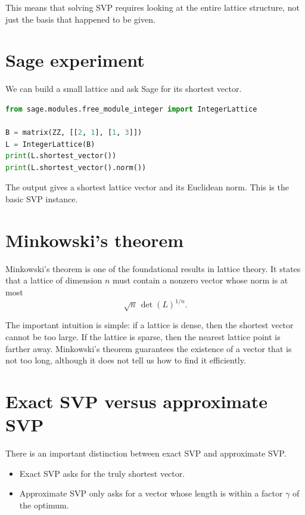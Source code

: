 This means that solving SVP requires looking at the entire lattice structure, not just the basis that happened to be given.

\section{Sage experiment}

We can build a small lattice and ask Sage for its shortest vector.

\begin{lstlisting}[language=Python]
from sage.modules.free_module_integer import IntegerLattice

B = matrix(ZZ, [[2, 1], [1, 3]])
L = IntegerLattice(B)
print(L.shortest_vector())
print(L.shortest_vector().norm())
\end{lstlisting}

The output gives a shortest lattice vector and its Euclidean norm. This is the basic SVP instance.

\section{Minkowski's theorem}

Minkowski's theorem is one of the foundational results in lattice theory. It states that a lattice of dimension $n$ must contain a nonzero vector whose norm is at most
\[
\sqrt{n}\,\det(L)^{1/n}.
\]

The important intuition is simple: if a lattice is dense, then the shortest vector cannot be too large. If the lattice is sparse, then the nearest lattice point is farther away. Minkowski's theorem guarantees the existence of a vector that is not too long, although it does not tell us how to find it efficiently.

\section{Exact SVP versus approximate SVP}

There is an important distinction between exact SVP and approximate SVP.

\begin{itemize}
  \item Exact SVP asks for the truly shortest vector.
  \item Approximate SVP only asks for a vector whose length is within a factor $\gamma$ of the optimum.
\end{itemize}

